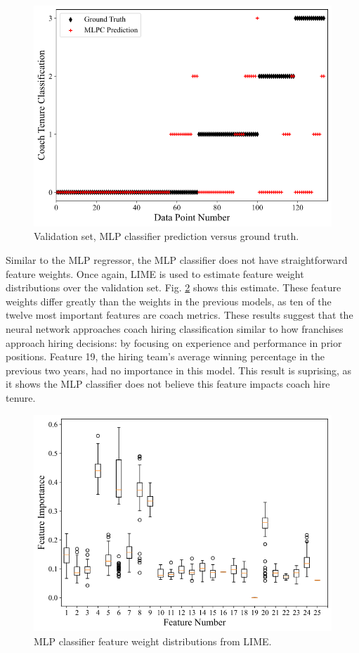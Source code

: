 \documentclass[conference]{IEEEtran}
\begin{document}
\begin{figure}[htbp]
\centerline{\includegraphics[width=1\linewidth]{test6.png}}
\caption{Validation set, MLP classifier prediction versus ground truth.}
\label{fig14}
\end{figure}

Similar to the MLP regressor, the MLP classifier does not have straightforward feature weights. Once again, LIME is used to estimate feature weight distributions over the validation set. Fig. \ref{fig15} shows this estimate. These feature weights differ greatly than the weights in the previous models, as ten of the twelve most important features are coach metrics. These results suggest that the neural network approaches coach hiring classification similar to how franchises approach hiring decisions: by focusing on experience and performance in prior positions. Feature 19, the hiring team's average winning percentage in the previous two years, had no importance in this model. This result is suprising, as it shows the MLP classifier does not believe this feature impacts coach hire tenure.

\begin{figure}[htbp]
\centerline{\includegraphics[width=1\linewidth]{weight6.png}}
\caption{MLP classifier feature weight distributions from LIME.}
\label{fig15}
\end{figure}
\end{document}
